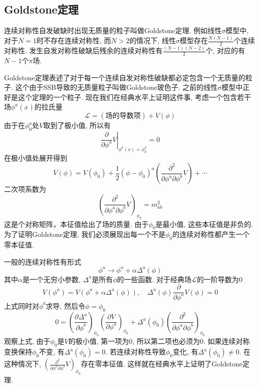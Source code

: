 \documentclass[a4paper,11pt]{article}
\begin{document}
\subsection{Goldstone定理}
连续对称性自发破缺时出现无质量的粒子叫做Goldstone定理. 例如线性$\sigma$模型中, 对于$N=1$时不存在连续对称性, 而$N>2$的情况下, 线性$\sigma$模型存在$\frac{N(N-1)}{2}$个连续对称性. 发生自发对称性破缺后残余的连续对称性有$\frac{(N-1)(N-2)}{2}$个, 对应的有$N-1$个$\pi$场.

Goldstone定理表述了对于每一个连续自发对称性破缺都必定包含一个无质量的粒子. 这个由于SSB导致的无质量粒子叫做Goldstone玻色子. 之前的线性$\sigma$模型中正好是这个定理的一个粒子. 现在我们在经典水平上证明这件事, 考虑一个包含若干场$\phi^a(x)$的拉氏量
\begin{equation*}
  \mathcal{L}=(\text{场的导数项})+V(\phi)
\end{equation*}
由于在$\phi_0^a$处$V$取到了极小值, 所以有
\begin{equation*}
  \left.\frac{\partial}{\partial\phi^a}V\right|_{\phi^a(x)=\phi_0^a}=0
\end{equation*}
在极小值处展开得到
\begin{equation*}
  V(\phi)=V(\phi_0)+\frac{1}{2}(\phi-\phi_0)^a(\frac{\partial^2}{\partial\phi^a\partial\phi^b}V)+\cdots
\end{equation*}
二次项系数为
\begin{equation*}
  \left(\frac{\partial^2}{\partial\phi^a\partial\phi^b}V\right)_{\phi_0}=m_{ab}^2
\end{equation*}
这是个对称矩阵，本征值给出了场的质量. 由于$\phi_0$是最小值, 这些本征值是非负的. 为了证明Goldstone定理, 我们必须展现出每一个不是$\phi_0$的连续对称性都产生一个零本征值.

一般的连续对称性有形式
\begin{equation*}
  \phi^a\rightarrow\phi^a+\alpha\Delta^a(\phi)
\end{equation*}
其中$\alpha$是一个无穷小参数, $\Delta^a$是所有$\phi$的一些函数. 对于经典场$\mathcal{L}$的一阶导数为$0$
\begin{equation*}
  V(\phi^a)=V(\phi^a+\alpha\Delta^a(\phi)),\quad \Delta^a(\phi)\frac{\partial}{\partial\phi^a}V(\phi)=0
\end{equation*}
上式同时对$\phi^b$求导, 然后令$\phi=\phi_0$
\begin{equation*}
  0=\left(\frac{\partial\Delta^a}{\partial\phi^b}\right)_{\phi_0}\left(\frac{\partial V}{\partial\phi^a}\right)_{\phi_0}+\Delta^a(\phi_0)\left(\frac{\partial^2}{\partial\phi^a\partial\phi^b}\right)_{\phi_0}
\end{equation*}
观察上式, 由于$\phi_0$是$V$的极小值, 第一项为$0$, 所以第二项也必须为$0$. 如果连续对称变换保持$\phi_0$不变, 有$\Delta^a(\phi_0)=0$. 若连续对称性导致$\phi_0$变化, 有$\Delta^a(\phi_0)\neq0$. 在这种情况下, $\left(\frac{\partial^2}{\partial\phi^a\partial\phi^b}V\right)_{\phi_0}$存在零本征值. 这样就在经典水平上证明了Goldstone定理.
\end{document}
